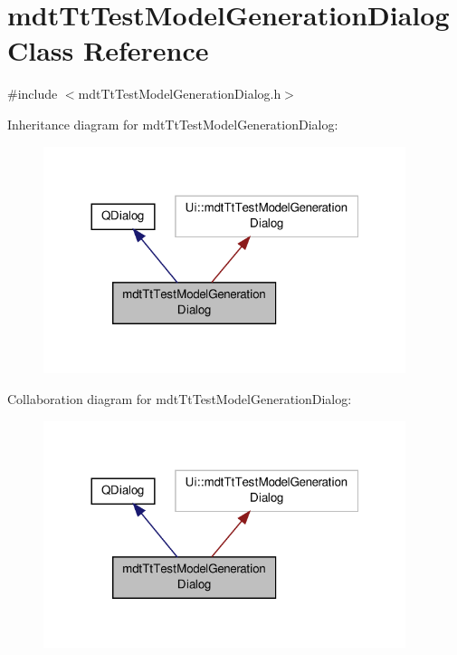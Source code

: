 \hypertarget{classmdt_tt_test_model_generation_dialog}{\section{mdt\-Tt\-Test\-Model\-Generation\-Dialog Class Reference}
\label{classmdt_tt_test_model_generation_dialog}
}


{\ttfamily \#include $<$mdt\-Tt\-Test\-Model\-Generation\-Dialog.\-h$>$}



Inheritance diagram for mdt\-Tt\-Test\-Model\-Generation\-Dialog\-:
\nopagebreak
\begin{figure}[H]
\begin{center}
\leavevmode
\includegraphics[width=300pt]{classmdt_tt_test_model_generation_dialog__inherit__graph}
\end{center}
\end{figure}


Collaboration diagram for mdt\-Tt\-Test\-Model\-Generation\-Dialog\-:
\nopagebreak
\begin{figure}[H]
\begin{center}
\leavevmode
\includegraphics[width=300pt]{classmdt_tt_test_model_generation_dialog__coll__graph}
\end{center}
\end{figure}
